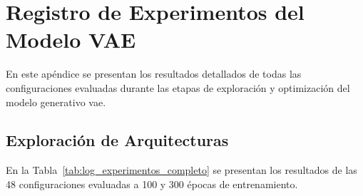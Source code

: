 \chapter{Registro de Experimentos del Modelo VAE}
\label{apendice:vae_experimentos}

En este apéndice se presentan los resultados detallados de todas las configuraciones evaluadas durante las etapas de exploración y optimización del modelo generativo \gls{vae}.

\section{Exploración de Arquitecturas}
\label{sec:apendice_vae_fase1}

En la Tabla~\ref{tab:log_experimentos_completo} se presentan los resultados de las 48 configuraciones evaluadas a 100 y 300 épocas de entrenamiento.

